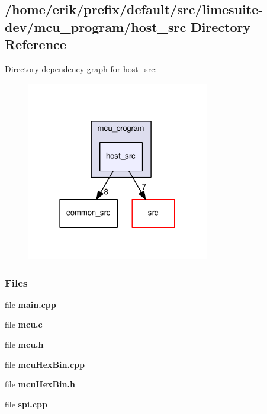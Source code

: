 \subsection{/home/erik/prefix/default/src/limesuite-\/dev/mcu\+\_\+program/host\+\_\+src Directory Reference}
\label{dir_e81315484f3f69ec128b93c8036a017b}
Directory dependency graph for host\+\_\+src\+:
\nopagebreak
\begin{figure}[H]
\begin{center}
\leavevmode
\includegraphics[width=226pt]{dir_e81315484f3f69ec128b93c8036a017b_dep}
\end{center}
\end{figure}
\subsubsection*{Files}
\begin{DoxyCompactItemize}
\item 
file {\bf main.\+cpp}
\item 
file {\bf mcu.\+c}
\item 
file {\bf mcu.\+h}
\item 
file {\bf mcu\+Hex\+Bin.\+cpp}
\item 
file {\bf mcu\+Hex\+Bin.\+h}
\item 
file {\bf spi.\+cpp}
\end{DoxyCompactItemize}
